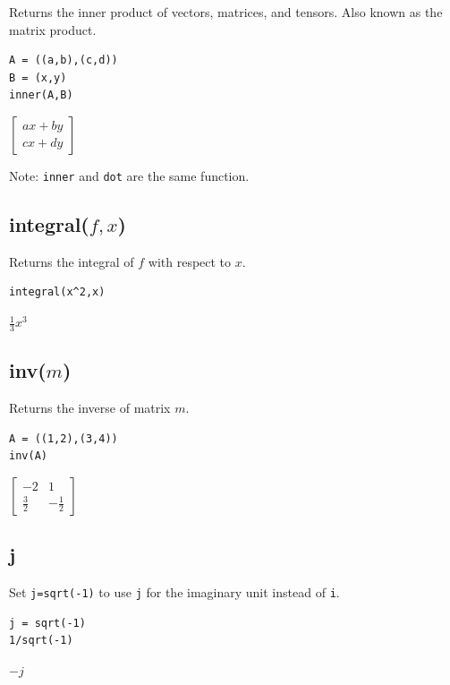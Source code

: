\documentclass[12pt]{article}
\begin{document}
Returns the inner product of vectors, matrices, and tensors.
Also known as the matrix product.

{\color{blue}
\begin{verbatim}
A = ((a,b),(c,d))
B = (x,y)
inner(A,B)
\end{verbatim}
}

\noindent
$\displaystyle
\begin{bmatrix}
ax+by
\\[1ex]
cx+dy
\end{bmatrix}
$

\bigskip
\noindent
Note: {\tt inner} and {\tt dot} are the same function.

\subsection*{integral($f,x$)}

Returns the integral of $f$ with respect to $x$.

{\color{blue}
\begin{verbatim}
integral(x^2,x)
\end{verbatim}
}

\noindent
$\displaystyle \tfrac{1}{3}x^3$

\subsection*{inv($m$)}

Returns the inverse of matrix $m$.

{\color{blue}
\begin{verbatim}
A = ((1,2),(3,4))
inv(A)
\end{verbatim}
}

\noindent
$\displaystyle
\begin{bmatrix}
-2 & 1
\\[1ex]
\tfrac{3}{2} & -\tfrac{1}{2}
\end{bmatrix}
$

\subsection*{j}

Set {\tt j=sqrt(-1)} to use {\tt j} for the imaginary unit instead of {\tt i}.

{\color{blue}
\begin{verbatim}
j = sqrt(-1)
1/sqrt(-1)
\end{verbatim}
}

\noindent
$-j$
\end{document}

